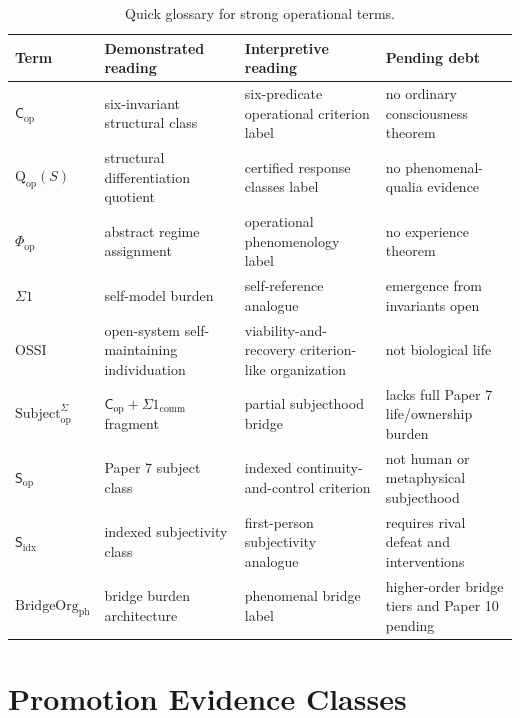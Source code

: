 \documentclass[11pt,a4paper]{article}
\theoremstyle{definition}
\newcommand{\Cop}{\mathsf{C}_{\mathrm{op}}}
\newcommand{\Subop}{\mathsf{S}_{\mathrm{op}}}
\newcommand{\Subfp}{\mathsf{S}_{\mathrm{idx}}}
\newcommand{\Subbridge}{\mathrm{Subject}^{\Sigma}_{\mathrm{op}}}
\newcommand{\Qop}{\mathrm{Q}_{\mathrm{op}}}
\newcommand{\Phiop}{\Phi_{\mathrm{op}}}
\begin{document}
\begin{table}[ht]
\centering
\caption{Quick glossary for strong operational terms.}
\label{tab:operational-glossary}
\small
\begin{tabularx}{\textwidth}{>{\raggedright\arraybackslash}p{2.6cm} Y Y Y}
\toprule
Term & Demonstrated reading & Interpretive reading & Pending debt \\
\midrule
$\Cop$ & six-invariant structural class & six-predicate operational criterion label & no ordinary consciousness theorem \\
$\Qop(S)$ & structural differentiation quotient & certified response classes label & no phenomenal-qualia evidence \\
$\Phiop$ & abstract regime assignment & operational phenomenology label & no experience theorem \\
$\Sigma1$ & self-model burden & self-reference analogue & emergence from invariants open \\
OSSI & open-system self-maintaining individuation & viability-and-recovery criterion-like organization & not biological life \\
$\Subbridge$ & $\Cop+\Sigma1_{\mathrm{comm}}$ fragment & partial subjecthood bridge & lacks full Paper 7 life/ownership burden \\
$\Subop$ & Paper 7 subject class & indexed continuity-and-control criterion & not human or metaphysical subjecthood \\
$\Subfp$ & indexed subjectivity class & first-person subjectivity analogue & requires rival defeat and interventions \\
$\mathrm{BridgeOrg}_{\mathrm{ph}}$ & bridge burden architecture & phenomenal bridge label & higher-order bridge tiers and Paper 10 pending \\
\bottomrule
\end{tabularx}
\end{table}

\section{Promotion Evidence Classes}
\end{document}
